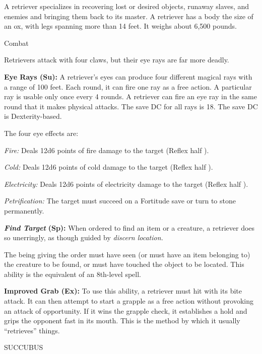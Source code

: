 \documentclass{article}
\begin{document}
A retriever specializes in recovering lost or desired objects, runaway slaves, 
and enemies and bringing them back to its master. A retriever has a body the size 
of an ox, with legs spanning more than 14 feet. It weighs about 6,500 pounds.

Combat

Retrievers attack with four claws, but their eye rays are far more deadly.

\textbf{Eye Rays (Su): }A retriever's eyes can produce four different magical rays 
with a range of 100 feet. Each round, it can fire one ray as a free action. A particular 
ray is usable only once every 4 rounds. A retriever can fire an eye ray in the 
same round that it makes physical attacks. The save DC for all rays is 18. The 
save DC is Dexterity-based.

The four eye effects are:

\textit{Fire: }Deals 12d6 points of fire damage to the target (Reflex half ).

\textit{Cold: }Deals 12d6 points of cold damage to the target (Reflex half ).

\textit{Electricity: }Deals 12d6 points of electricity damage to the target (Reflex 
half ).

\textit{Petrification: }The target must succeed on a Fortitude save or turn to 
stone permanently.

\textit{\textbf{Find Target }}\textbf{(Sp):} When ordered to find an item or a 
creature, a retriever does so unerringly, as though guided by \textit{discern location.}

The being giving the order must have seen (or must have an item belonging to) the 
creature to be found, or must have touched the object to be located. This ability 
is the equivalent of an 8th-level spell.

\textbf{Improved Grab (Ex): }To use this ability, a retriever must hit with its 
bite attack. It can then attempt to start a grapple as a free action without provoking 
an attack of opportunity. If it wins the grapple check, it establishes a hold and 
grips the opponent fast in its mouth. This is the method by which it usually ``retrieves'' 
things.

\vspace{12pt}
SUCCUBUS
\end{document}
